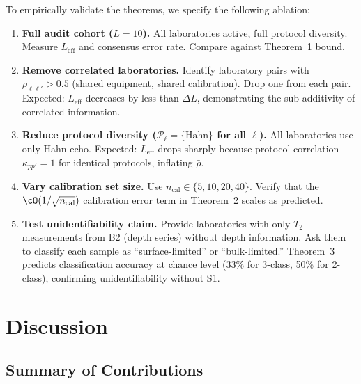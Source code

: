\documentclass[11pt,a4paper]{article}
\newcommand{\eff}{\mathrm{eff}}
\theoremstyle{definition}
\newcommand{\cP}{\mathcal{P}}
\newcommand{\Ttwo}{T_2}
\begin{document}
To empirically validate the theorems, we specify the following ablation:

\begin{enumerate}[label=\textbf{A\arabic*:}, leftmargin=*]
    \item \textbf{Full audit cohort ($L=10$).} All laboratories active,
    full protocol diversity. Measure $L_{\eff}$ and consensus error rate.
    Compare against Theorem~1 bound.

    \item \textbf{Remove correlated laboratories.} Identify laboratory pairs
    with $\rho_{\ell\ell'} > 0.5$ (shared equipment, shared calibration).
    Drop one from each pair. Expected: $L_{\eff}$ decreases by less than
    $\Delta L$, demonstrating the sub-additivity of correlated information.

    \item \textbf{Reduce protocol diversity ($\cP_\ell = \{\text{Hahn}\}$ for all $\ell$).}
    All laboratories use only Hahn echo. Expected: $L_{\eff}$ drops sharply
    because protocol correlation $\kappa_{pp'} = 1$ for identical protocols,
    inflating $\bar{\rho}$.

    \item \textbf{Vary calibration set size.} Use $n_{\text{cal}} \in \{5, 10, 20, 40\}$.
    Verify that the $\cO(1/\sqrt{n_{\text{cal}}})$ calibration error term
    in Theorem~2 scales as predicted.

    \item \textbf{Test unidentifiability claim.} Provide laboratories with
    only $\Ttwo$ measurements from B2 (depth series) without depth information.
    Ask them to classify each sample as ``surface-limited'' or ``bulk-limited.''
    Theorem~3 predicts classification accuracy at chance level (33\% for
    3-class, 50\% for 2-class), confirming unidentifiability without S1.
\end{enumerate}

\section{Discussion }
\label{sec:discussion}

\subsection{Summary of Contributions}
\end{document}
